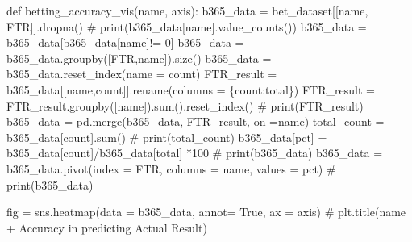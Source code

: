 \documentclass[
  letterpaper,
  DIV=11,
  numbers=noendperiod]{scrartcl}
\newenvironment{Shaded}{\begin{snugshade}}{\end{snugshade}}
\newcommand{\BuiltInTok}[1]{\textcolor[rgb]{0.00,0.23,0.31}{#1}}
\newcommand{\CommentTok}[1]{\textcolor[rgb]{0.37,0.37,0.37}{#1}}
\newcommand{\DecValTok}[1]{\textcolor[rgb]{0.68,0.00,0.00}{#1}}
\newcommand{\KeywordTok}[1]{\textcolor[rgb]{0.00,0.23,0.31}{#1}}
\newcommand{\NormalTok}[1]{\textcolor[rgb]{0.00,0.23,0.31}{#1}}
\newcommand{\OperatorTok}[1]{\textcolor[rgb]{0.37,0.37,0.37}{#1}}
\newcommand{\StringTok}[1]{\textcolor[rgb]{0.13,0.47,0.30}{#1}}
\newcommand{\VariableTok}[1]{\textcolor[rgb]{0.07,0.07,0.07}{#1}}
\begin{document}
\begin{Shaded}
\begin{Highlighting}[]
\KeywordTok{def}\NormalTok{ betting\_accuracy\_vis(name, axis):}
\NormalTok{    b365\_data }\OperatorTok{=}\NormalTok{ bet\_dataset[[name, }\StringTok{\textquotesingle{}FTR\textquotesingle{}}\NormalTok{]].dropna()}
    \CommentTok{\# print(b365\_data[name].value\_counts())}
\NormalTok{    b365\_data }\OperatorTok{=}\NormalTok{ b365\_data[b365\_data[name]}\OperatorTok{!=} \StringTok{\textquotesingle{}0\textquotesingle{}}\NormalTok{]}
\NormalTok{    b365\_data }\OperatorTok{=}\NormalTok{ b365\_data.groupby([}\StringTok{\textquotesingle{}FTR\textquotesingle{}}\NormalTok{,name]).size()}
\NormalTok{    b365\_data }\OperatorTok{=}\NormalTok{ b365\_data.reset\_index(name }\OperatorTok{=} \StringTok{\textquotesingle{}count\textquotesingle{}}\NormalTok{)}
\NormalTok{    FTR\_result }\OperatorTok{=}\NormalTok{ b365\_data[[name,}\StringTok{\textquotesingle{}count\textquotesingle{}}\NormalTok{]].rename(columns }\OperatorTok{=}\NormalTok{ \{}\StringTok{\textquotesingle{}count\textquotesingle{}}\NormalTok{:}\StringTok{\textquotesingle{}total\textquotesingle{}}\NormalTok{\})}
\NormalTok{    FTR\_result }\OperatorTok{=}\NormalTok{ FTR\_result.groupby([name]).}\BuiltInTok{sum}\NormalTok{().reset\_index()}
    \CommentTok{\# print(FTR\_result)}
\NormalTok{    b365\_data }\OperatorTok{=}\NormalTok{ pd.merge(b365\_data, FTR\_result, on }\OperatorTok{=}\NormalTok{name)}
\NormalTok{    total\_count }\OperatorTok{=}\NormalTok{ b365\_data[}\StringTok{\textquotesingle{}count\textquotesingle{}}\NormalTok{].}\BuiltInTok{sum}\NormalTok{()}
    \CommentTok{\# print(total\_count)}
\NormalTok{    b365\_data[}\StringTok{\textquotesingle{}pct\textquotesingle{}}\NormalTok{] }\OperatorTok{=}\NormalTok{ b365\_data[}\StringTok{\textquotesingle{}count\textquotesingle{}}\NormalTok{]}\OperatorTok{/}\NormalTok{b365\_data[}\StringTok{\textquotesingle{}total\textquotesingle{}}\NormalTok{] }\OperatorTok{*}\DecValTok{100}
    \CommentTok{\# print(b365\_data)}
\NormalTok{    b365\_data }\OperatorTok{=}\NormalTok{ b365\_data.pivot(index }\OperatorTok{=} \StringTok{\textquotesingle{}FTR\textquotesingle{}}\NormalTok{, columns }\OperatorTok{=}\NormalTok{ name, values }\OperatorTok{=} \StringTok{\textquotesingle{}pct\textquotesingle{}}\NormalTok{)}
    \CommentTok{\# print(b365\_data)}

\NormalTok{    fig }\OperatorTok{=}\NormalTok{ sns.heatmap(data }\OperatorTok{=}\NormalTok{ b365\_data, annot}\OperatorTok{=} \VariableTok{True}\NormalTok{, ax }\OperatorTok{=}\NormalTok{ axis)}
    \CommentTok{\# plt.title(name + \textquotesingle{} Accuracy in predicting Actual Result\textquotesingle{})}
    

\end{Highlighting}
\end{Shaded}
\end{document}
